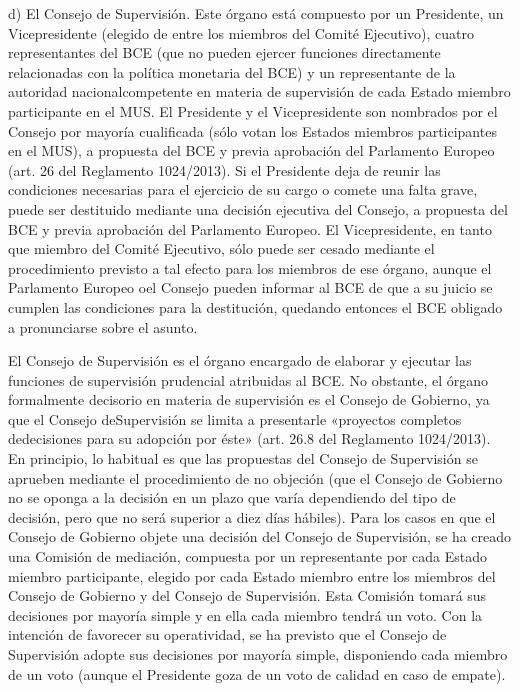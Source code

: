 \documentclass[10pt,a4paper]{article}
\begin{document}
d) El Consejo de Supervisión. Este órgano está compuesto por un Presidente, un Vicepresidente (elegido de entre los miembros del Comité Ejecutivo), cuatro representantes del BCE (que no pueden ejercer funciones directamente relacionadas con la política monetaria del BCE) y un representante de la autoridad nacionalcompetente en materia de supervisión de cada Estado miembro participante en el MUS. El Presidente y el Vicepresidente son nombrados por el Consejo por mayoría cualificada (sólo votan los Estados miembros participantes en el MUS), a propuesta del BCE y previa aprobación del Parlamento Europeo (art. 26 del Reglamento 1024/2013). Si el Presidente deja de reunir las condiciones necesarias para el ejercicio de su cargo o comete una falta grave, puede ser destituido mediante una decisión ejecutiva del Consejo, a propuesta del BCE y previa aprobación del Parlamento Europeo. El Vicepresidente, en tanto que miembro del Comité Ejecutivo, sólo puede ser cesado mediante el procedimiento previsto a tal efecto para los miembros de ese órgano, aunque el Parlamento Europeo oel Consejo pueden informar al BCE de que a su juicio se cumplen las condiciones para la destitución, quedando entonces el BCE obligado a pronunciarse sobre el asunto.

El Consejo de Supervisión es el órgano encargado de elaborar y ejecutar las funciones de supervisión prudencial atribuidas al BCE. No obstante, el órgano formalmente decisorio en materia de supervisión es el Consejo de Gobierno, ya que el Consejo deSupervisión se limita a presentarle «proyectos completos dedecisiones para su adopción por éste» (art. 26.8 del Reglamento 1024/2013). En principio, lo habitual es que las propuestas del Consejo de Supervisión se aprueben mediante el procedimiento de no objeción (que el Consejo de Gobierno no se oponga a la decisión en un plazo que varía dependiendo del tipo de decisión, pero que no será superior a diez días hábiles). Para los casos en que el Consejo de Gobierno objete una decisión del Consejo de Supervisión, se ha creado una Comisión de mediación, compuesta por un representante por cada Estado miembro participante, elegido por cada Estado miembro entre los miembros del Consejo de Gobierno y del Consejo de Supervisión. Esta Comisión tomará sus decisiones por mayoría simple y en ella cada miembro tendrá un voto. Con la intención de favorecer su operatividad, se ha previsto que el Consejo de Supervisión adopte sus decisiones por mayoría simple, disponiendo cada miembro de un voto (aunque el Presidente goza de un voto de calidad en caso de empate).
 
\end{document}
